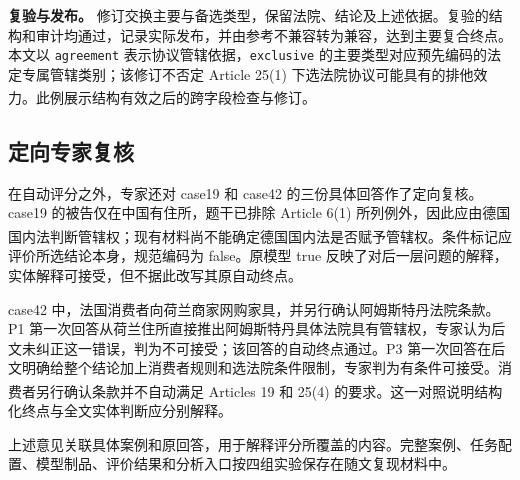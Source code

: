 \documentclass[pdflatex,iicol,sn-mathphys-num]{sn-jnl}
\newcommand{\paperref}[1]{\textsuperscript{\textcolor{citationred}{\citep{#1}}}}
\begin{document}
\textbf{复验与发布。} 修订交换主要与备选类型，保留法院、结论及上述依据。复验的结构和审计均通过，记录实际发布，并由参考不兼容转为兼容，达到主要复合终点。本文以 \texttt{agreement} 表示协议管辖依据，\texttt{exclusive} 的主要类型对应预先编码的法定专属管辖类别；该修订不否定 Article 25(1) 下选法院协议可能具有的排他效力\paperref{EU1215_2012_Consolidated20150226}。此例展示结构有效之后的跨字段检查与修订。


\subsection{定向专家复核}\label{app:D-4}

在自动评分之外，专家还对 case19 和 case42 的三份具体回答作了定向复核。case19 的被告仅在中国有住所，题干已排除 Article 6(1) 所列例外，因此应由德国国内法判断管辖权；现有材料尚不能确定德国国内法是否赋予管辖权\paperref{EU1215_2012_Consolidated20150226}。条件标记应评价所选结论本身，规范编码为 false。原模型 true 反映了对后一层问题的解释，实体解释可接受，但不据此改写其原自动终点。


case42 中，法国消费者向荷兰商家网购家具，并另行确认阿姆斯特丹法院条款。P1 第一次回答从荷兰住所直接推出阿姆斯特丹具体法院具有管辖权，专家认为后文未纠正这一错误，判为不可接受；该回答的自动终点通过。P3 第一次回答在后文明确给整个结论加上消费者规则和选法院条件限制，专家判为有条件可接受。消费者另行确认条款并不自动满足 Articles 19 和 25(4) 的要求\paperref{EU1215_2012_Consolidated20150226}。这一对照说明结构化终点与全文实体判断应分别解释。


上述意见关联具体案例和原回答，用于解释评分所覆盖的内容。完整案例、任务配置、模型制品、评价结果和分析入口按四组实验保存在随文复现材料中。


\FloatBarrier


\end{document}
